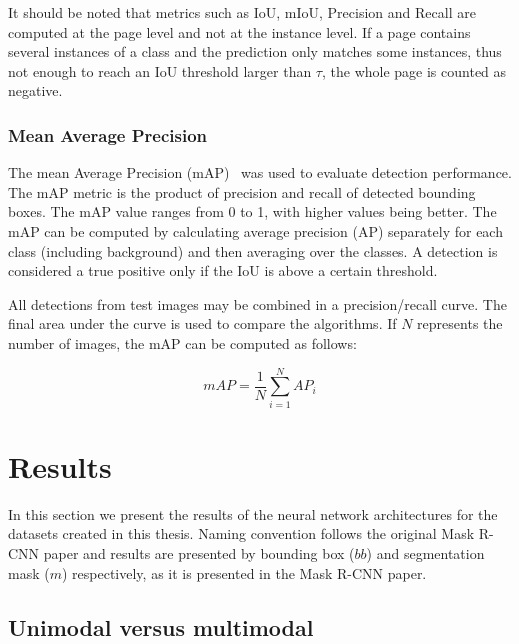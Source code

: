 \documentclass[oneside, english, bibtex]{kththesis}
\begin{document}
It should be noted that metrics such as IoU, mIoU, Precision and Recall are computed at the page level and not at the instance level. If a page contains several instances of a class and the prediction only matches some instances, thus not enough to reach an IoU threshold larger than $\tau$, the whole page is counted as negative.


\subsection{Mean Average Precision}

The mean Average Precision (mAP)~\cite{zhang2009average} was used to evaluate detection performance. The mAP metric is the product of precision and recall of detected bounding boxes. The mAP value ranges from 0 to 1, with higher values being better. The mAP can be computed by calculating average precision (AP) separately for each class (including background) and then averaging over the classes. A detection is considered a true positive only if the IoU is above a certain threshold.

All detections from test images may be combined in a precision/recall curve. The final area under the curve is used to compare the algorithms. If $N$ represents the number of images, the mAP can be computed as follows:

\begin{equation}
mAP = \frac{1}{N} \sum_{i=1}^{N} AP_i
    \label{eqn:map}
\end{equation}


\chapter{Results}
\label{ch:results}

In this section we present the results of the neural network architectures for the datasets created in this thesis. Naming convention follows the original Mask R-CNN paper and results are presented by bounding box ($bb$) and segmentation mask ($m$) respectively, as it is presented in the Mask R-CNN paper.

\section{Unimodal versus multimodal}
\end{document}
